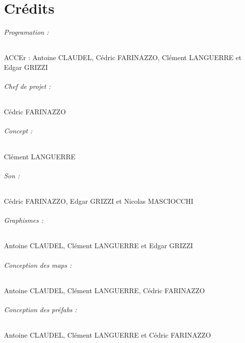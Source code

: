 \documentclass[titlepage, 11px, a4paper]{report}
\begin{document}
\part{Crédits} 
\paragraph*{Programation : } \hspace{0pt}
ACCEr :
Antoine CLAUDEL, 
Cédric FARINAZZO, 
Clément LANGUERRE et  
Edgar GRIZZI \\

\paragraph*{Chef de projet : } \hspace{0pt}
Cédric FARINAZZO \\

\paragraph*{Concept : } \hspace{0pt}
Clément LANGUERRE \\

\paragraph*{Son : } \hspace{0pt}
Cédric FARINAZZO, 
Edgar GRIZZI et 
Nicolas MASCIOCCHI \\

\paragraph*{Graphismes : } \hspace{0pt}
Antoine CLAUDEL, 
Clément LANGUERRE et 
Edgar GRIZZI \\

\paragraph*{Conception des maps : } \hspace{0pt}
Antoine CLAUDEL, 
Clément LANGUERRE, 
Cédric FARINAZZO \\

\paragraph*{Conception des préfabs : } \hspace{0pt}
Antoine CLAUDEL, 
Clément LANGUERRE et 
Cédric FARINAZZO \\
\end{document}
